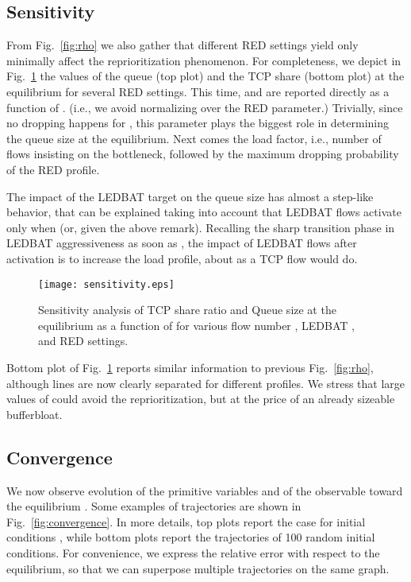 \documentclass[conference]{IEEEtran}
\newcommand{\secL}[1]{\label{sec:#1}}
\newcommand{\figR}[1]{Fig.~\ref{fig:#1}}
\newcommand{\figLC}[2]{
		\caption{#2}
		\label{fig:#1}
}
\begin{document}
\subsection{Sensitivity}\secL{sensitivity}

From \figR{rho} we also gather that different RED settings yield only minimally affect the reprioritization phenomenon. For completeness, we depict in \figR{sensitivity} the values of the queue  (top plot) and the TCP share   (bottom plot) at the equilibrium for several RED settings. This time,  and  are reported directly as a function of . (i.e., we avoid normalizing over the RED  parameter.) 
Trivially, since no dropping happens for , this parameter plays the biggest role in determining the queue size at the equilibrium. Next comes the load factor, i.e., number of flows insisting on the bottleneck, followed by the maximum dropping probability  of the RED profile. 

The impact of the LEDBAT target  on the queue size has almost a step-like behavior, that can be explained taking into account that LEDBAT flows activate only when  (or,  given the above remark). 
Recalling the sharp transition phase in LEDBAT aggressiveness as soon as , the impact of LEDBAT flows after activation is to increase the load profile, about as a TCP flow would do.


\begin{figure}[t]
    \begin{center}
		\texttt{[image: sensitivity.eps]}
        \figLC{sensitivity}{Sensitivity analysis of TCP share ratio  and Queue size  at the equilibrium as a function of  for various flow number , LEDBAT , and RED  settings.}
    \end{center}
\end{figure}


Bottom plot of \figR{sensitivity} reports similar information to previous \figR{rho}, although lines are now clearly separated for different  profiles. We stress that large values of  could avoid the reprioritization, but at the price of an already sizeable bufferbloat. 

\subsection{Convergence}\secL{convergence}

We now observe evolution of the primitive  variables and of the  observable toward the equilibrium . Some examples of trajectories are shown in \figR{convergence}.
In more details, top plots report the case for initial conditions , while bottom plots report the trajectories of 100 random initial conditions. For convenience, we express the relative error with respect to the equilibrium, so that we can superpose multiple trajectories on the same graph.
\end{document}
